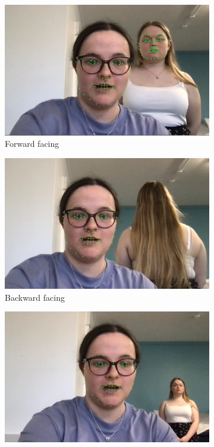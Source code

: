 \documentclass[12pt]{article}
\theoremstyle{plain}
\theoremstyle{definition}
\begin{document}
\begin{figure}
     \centering
     \begin{subfigure}[b]{0.3\textwidth}
         \centering
         \includegraphics[width=\textwidth]{img/face_img1.png}
         \caption{Forward facing}
         \label{fig:face_a}
     \end{subfigure}
     \hfill
     \begin{subfigure}[b]{0.3\textwidth}
         \centering
         \includegraphics[width=\textwidth]{img/face_img2.png}
         \caption{Backward facing}
         \label{fig:face_b}
     \end{subfigure}
     \hfill
     \begin{subfigure}[b]{0.3\textwidth}
         \centering
         \includegraphics[width=\textwidth]{img/face_img3.png}

\end{subfigure}
\end{figure}
\end{document}
